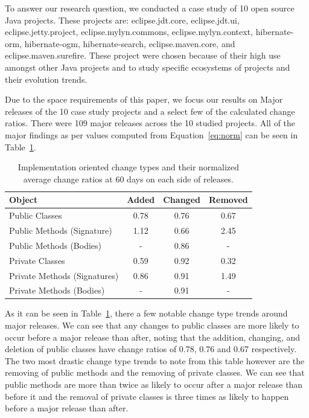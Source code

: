 \documentclass[conference]{IEEEtran}
\begin{document}
To answer our research question, we conducted a case study of 10 open source Java projects. These projects are: eclipse.jdt.core, eclipse.jdt.ui, eclipse.jetty.project, 
eclipse.mylyn.commons, eclipse.mylyn.context, hibernate-orm, hibernate-ogm, hibernate-search, eclipse.maven.core, and eclipse.maven.surefire. These project were chosen
because of their high use amongst other Java projects and to study specific ecosystems of projects and their evolution trends.

Due to the space requirements of this paper, we focus our results on Major releases of the 10 case study projects and a select few of the calculated change ratios. 
There were 109 major releases across the 10 studied projects. All of the major findings as per values computed from Equation~\ref{eq:norm}
can be seen in Table~\ref{tab:ratio}.

\begin{table}[h]
\begin{center}
\begin{tabular}{| l | c | c | c |}
\hline
Object & Added & Changed & Removed\\
\hline
Public Classes & 0.78 & 0.76 & 0.67 \\
Public Methods (Signature) & 1.12 & 0.66 & 2.45 \\
Public Methods (Bodies) & - & 0.86 & - \\
Private Classes & 0.59 & 0.92 & 0.32 \\
Private Methods (Signatures) & 0.86 & 0.91 & 1.49 \\
Private Methods (Bodies) & - & 0.91 & - \\
\hline
\end{tabular}
\end{center}
\caption{Implementation oriented change types and their normalized average change ratios at 60 days on each side of releases. \label{tab:ratio}}
\end{table}

As it can be seen in Table~\ref{tab:ratio}, there a few notable change type trends around major releases. We can see that any changes to public classes are
more likely to occur before a major release than after, noting that the addition, changing, and deletion of public classes have change ratios of 0.78, 
0.76 and 0.67 respectively. The two most drastic change type trends to note from this table however are the removing of public methods and the removing
of private classes. We can see that public methods are more than twice as likely to occur after a major release than before it and the removal of 
private classes is three times as likely to happen before a major release than after. 
\end{document}

